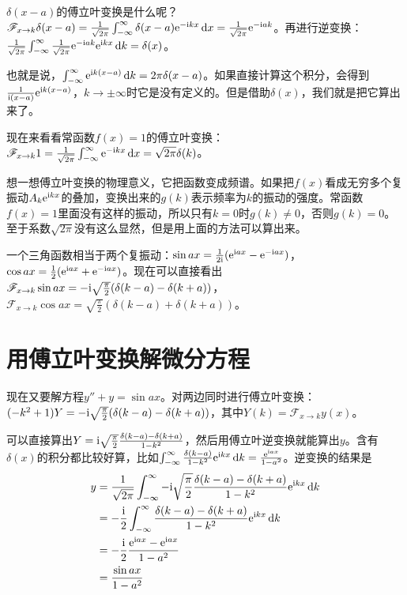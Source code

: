 $\delta(x-a)$的傅立叶变换是什么呢？$\mathscr{F}_{x \rightarrow k} \delta(x-a)=\frac{1}{\sqrt{2 \pi}} \int_{-\infty}^{\infty} \delta(x-a) \mathrm{e}^{-\mathrm{i} k x} \mathop{}\!\mathrm{d} x=\frac{1}{\sqrt{2 \pi}} \mathrm{e}^{-\mathrm{i} a k}$。再进行逆变换：$\frac{1}{\sqrt{2 \pi}} \int_{-\infty}^{\infty} \frac{1}{\sqrt{2 \pi}} \mathrm{e}^{-\mathrm{i} a k} \mathrm{e}^{\mathrm{i} k x} \mathop{}\!\mathrm{d} k=\delta(x)$。

也就是说，$\int_{-\infty}^{\infty} \mathrm{e}^{\mathrm{i} k (x-a)} \mathop{}\!\mathrm{d} k=2 \pi \delta(x-a)$。如果直接计算这个积分，会得到$\frac{1}{\mathrm{i} (x-a)} \mathrm{e}^{\mathrm{i} k (x-a)}$，$k \rightarrow \pm \infty$时它是没有定义的。但是借助$\delta(x)$，我们就是把它算出来了。

现在来看看常函数$f(x)=1$的傅立叶变换：$\mathscr{F}_{x \rightarrow k} 1=\frac{1}{\sqrt{2 \pi}} \int_{-\infty}^{\infty} \mathrm{e}^{-\mathrm{i} k x} \mathop{}\!\mathrm{d} x=\sqrt{2 \pi} \delta(k)$。

想一想傅立叶变换的物理意义，它把函数变成频谱。如果把$f(x)$看成无穷多个复振动$A_k \mathrm{e}^{\mathrm{i} k x}$的叠加，变换出来的$g(k)$表示频率为$k$的振动的强度。常函数$f(x)=1$里面没有这样的振动，所以只有$k=0$时$g(k) \neq 0$，否则$g(k)=0$。至于系数$\sqrt{2 \pi}$没有这么显然，但是用上面的方法可以算出来。

一个三角函数相当于两个复振动：$\sin a x=\frac{1}{2 \mathrm{i}}(\mathrm{e}^{\mathrm{i} a x}-\mathrm{e}^{-\mathrm{i} a x})$，$\cos a x=\frac{1}{2}(\mathrm{e}^{\mathrm{i} a x}+\mathrm{e}^{-\mathrm{i} a x})$。现在可以直接看出$\mathscr{F}_{x \rightarrow k} \sin a x=-\mathrm{i} \sqrt{\frac{\pi}{2}} (\delta(k-a)-\delta(k+a))$，$\mathscr{F}_{x \rightarrow k} \cos a x=\sqrt{\frac{\pi}{2}} (\delta(k-a)+\delta(k+a))$。
\section{用傅立叶变换解微分方程}
现在又要解方程$y''+y=\sin a x$。对两边同时进行傅立叶变换：$(-k^2+1) Y=-\mathrm{i} \sqrt{\frac{\pi}{2}} (\delta(k-a)-\delta(k+a))$，其中$Y(k)=\mathscr{F}_{x \rightarrow k} y(x)$。

可以直接算出$Y=\mathrm{i} \sqrt{\frac{\pi}{2}} \frac{\delta(k-a)-\delta(k+a)}{1-k^2}$，然后用傅立叶逆变换就能算出$y$。含有$\delta(x)$的积分都比较好算，比如$\int_{-\infty}^{\infty} \frac{\delta(k-a)}{1-k^2} \mathrm{e}^{\mathrm{i} k x} \mathop{}\!\mathrm{d} k=\frac{\mathrm{e}^{\mathrm{i} a x}}{1-a^2}$。逆变换的结果是
\begin{align*}
y&=\frac{1}{\sqrt{2 \pi}} \int_{-\infty}^{\infty} -\mathrm{i} \sqrt{\frac{\pi}{2}} \frac{\delta(k-a)-\delta(k+a)}{1-k^2} \mathrm{e}^{\mathrm{i} k x} \mathop{}\!\mathrm{d} k \\
&=-\frac{\mathrm{i}}{2} \int_{-\infty}^{\infty} \frac{\delta(k-a)-\delta(k+a)}{1-k^2} \mathrm{e}^{\mathrm{i} k x} \mathop{}\!\mathrm{d} k \\
&=-\frac{\mathrm{i}}{2} \frac{\mathrm{e}^{\mathrm{i} a x}-\mathrm{e}^{\mathrm{i} a x}}{1-a^2} \\
&=\frac{\sin a x}{1-a^2}
\end{align*}

